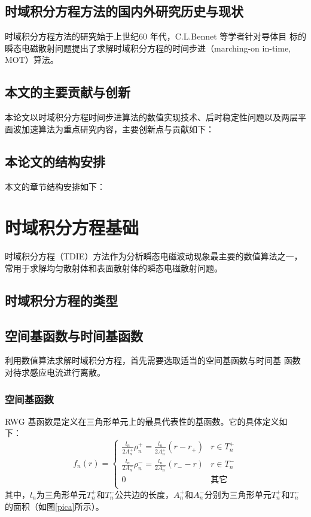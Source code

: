 \documentclass[doctor]{thesisUESTC}
\begin{document}
\section{时域积分方程方法的国内外研究历史与现状}
时域积分方程方法的研究始于上世纪60 年代，C.L.Bennet 等学者针对导体目
标的瞬态电磁散射问题提出了求解时域积分方程的时间步进（marching-on in-time,
MOT）算法。

\section{本文的主要贡献与创新}
本论文以时域积分方程时间步进算法的数值实现技术、后时稳定性问题以及两层平面波加速算法为重点研究内容，主要创新点与贡献如下：

\section{本论文的结构安排}
本文的章节结构安排如下：


\chapter{时域积分方程基础}
时域积分方程（TDIE）方法作为分析瞬态电磁波动现象最主要的数值算法之一，常用于求解均匀散射体和表面散射体的瞬态电磁散射问题。

\section{时域积分方程的类型}

\section{空间基函数与时间基函数}
利用数值算法求解时域积分方程，首先需要选取适当的空间基函数与时间基
函数对待求感应电流进行离散。

\subsection{空间基函数}
RWG 基函数是定义在三角形单元上的最具代表性的基函数。它的具体定义如
下：
\begin{equation}
f_n(r)=
\begin{cases}
\frac{l_n}{2A_n^+}\rho_n^+=\frac{l_n}{2A_n^+}(r-r_+)&r\in T_n^+\\
\frac{l_n}{2A_n^-}\rho_n^-=\frac{l_n}{2A_n^-}(r_--r)&r\in T_n^-\\
0&\text{其它}\\
\end{cases}
\end{equation}
其中，$l_n$为三角形单元$T_n^+$和$T_n^-$公共边的长度，$A_n^+$和$A_n^-$分别为三角形单元$T_n^+$和$T_n^-$的面积（如图\ref{pica}所示）。
\end{document}

